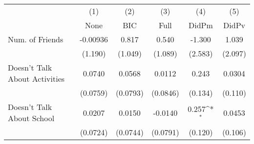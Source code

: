 {
\def\sym#1{\ifmmode^{#1}\else\(^{#1}\)\fi}
\begin{tabular}{l*{5}{c}}
\toprule
            &\multicolumn{1}{c}{(1)}&\multicolumn{1}{c}{(2)}&\multicolumn{1}{c}{(3)}&\multicolumn{1}{c}{(4)}&\multicolumn{1}{c}{(5)}\\
            &\multicolumn{1}{c}{None}&\multicolumn{1}{c}{BIC}&\multicolumn{1}{c}{Full}&\multicolumn{1}{c}{DidPm}&\multicolumn{1}{c}{DidPv}\\
\midrule
Num. of Friends&    -0.00936         &       0.817         &       0.540         &      -1.300         &       1.039         \\
            &     (1.190)         &     (1.049)         &     (1.089)         &     (2.583)         &     (2.097)         \\
\addlinespace
Doesn't Talk About Activities&      0.0740         &      0.0568         &      0.0112         &       0.243         &      0.0304         \\
            &    (0.0759)         &    (0.0793)         &    (0.0846)         &     (0.134)         &     (0.110)         \\
\addlinespace
Doesn't Talk About School&      0.0207         &      0.0150         &     -0.0140         &       0.257\sym{*}  &      0.0453         \\
            &    (0.0724)         &    (0.0744)         &    (0.0791)         &     (0.120)         &     (0.106)         \\
\bottomrule
\end{tabular}
}
